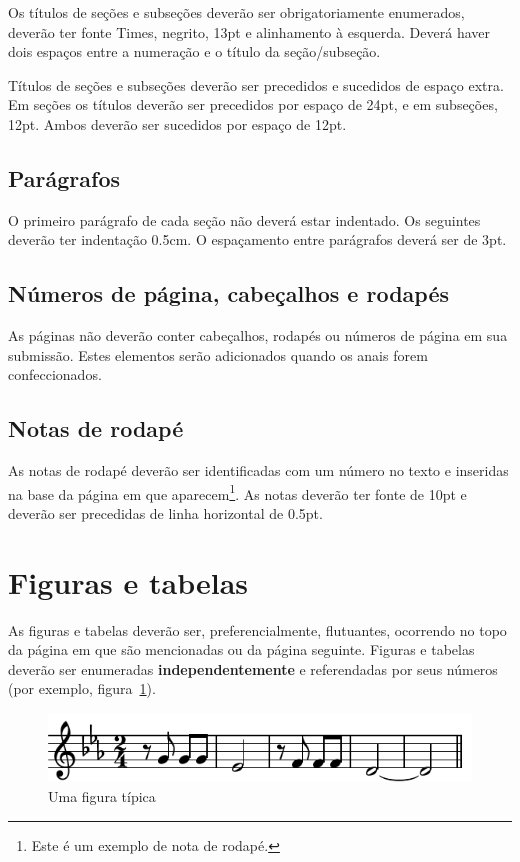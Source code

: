 \documentclass[12pt]{article}
\begin{document}
Os títulos de seções e subseções deverão ser obrigatoriamente
enumerados, deverão ter fonte Times, negrito, 13pt e alinhamento à
esquerda. Deverá haver dois espaços entre a numeração e o título da
seção/subseção.

Títulos de seções e subseções deverão ser precedidos e sucedidos de
espaço extra. Em seções os títulos deverão ser precedidos por espaço
de 24pt, e em subseções, 12pt. Ambos deverão ser sucedidos por espaço
de 12pt.

\subsection{Parágrafos}
\label{sec:paragrafos}

O primeiro parágrafo de cada seção não deverá estar indentado. Os
seguintes deverão ter indentação 0.5cm. O espaçamento entre parágrafos
deverá ser de 3pt.

\subsection{Números de página, cabeçalhos e rodapés}

As páginas não deverão conter cabeçalhos, rodapés ou números de página
em sua submissão. Estes elementos serão adicionados quando os anais
forem confeccionados.

\subsection{Notas de rodapé}

As notas de rodapé deverão ser identificadas com um número no texto e
inseridas na base da página em que aparecem\footnote{Este é um exemplo
  de nota de rodapé.}. As notas deverão ter fonte de 10pt e deverão ser
precedidas de linha horizontal de 0.5pt.

\section{Figuras e tabelas}
\label{sec:figuras-e-tabelas}

As figuras e tabelas deverão ser, preferencialmente, flutuantes,
ocorrendo no topo da página em que são mencionadas ou da página
seguinte. Figuras e tabelas deverão ser enumeradas
\textbf{independentemente} e referendadas por seus números (por
exemplo, figura~\ref{fig:exampleFig}).

\begin{figure}
\centering
\includegraphics[width=.5\textwidth]{beethoven}
\caption{Uma figura típica}
\label{fig:exampleFig}
\end{figure}
\end{document}
